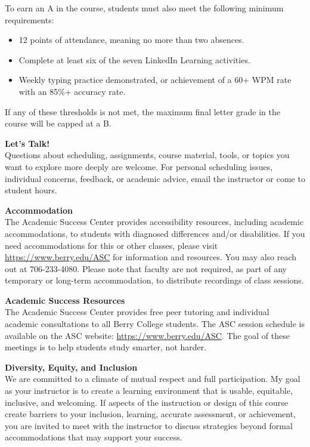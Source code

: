 \documentclass[11pt,letterpaper]{article}
\newcommand{\lefthead}[2]{\noindent\textbf{#1}\hfill\\[#2]}
\newcommand{\blankline}{\par\vspace{0.3cm}}
\begin{document}
\noindent To earn an A in the course, students must also meet the following minimum requirements:
\begin{itemize}
    \item 12 points of attendance, meaning no more than two absences.
    \item Complete at least six of the seven LinkedIn Learning activities.
    \item Weekly typing practice demonstrated, or achievement of a 60+ WPM rate with an 85\%+ accuracy rate.
\end{itemize}
If any of these thresholds is not met, the maximum final letter grade in the course will be capped at a B.
\blankline

\lefthead{Let's Talk!}{0.3cm}
Questions about scheduling, assignments, course material, tools, or topics you want to explore more deeply are welcome. For personal scheduling issues, individual concerns, feedback, or academic advice, email the instructor or come to student hours.
\blankline

\lefthead{Accommodation}{0.3cm}
The Academic Success Center provides accessibility resources, including academic accommodations, to students with diagnosed differences and/or disabilities. If you need accommodations for this or other classes, please visit \url{https://www.berry.edu/ASC} for information and resources. You may also reach out at 706-233-4080. Please note that faculty are not required, as part of any temporary or long-term accommodation, to distribute recordings of class sessions.
\blankline

\lefthead{Academic Success Resources}{0.3cm}
The Academic Success Center provides free peer tutoring and individual academic consultations to all Berry College students. The ASC session schedule is available on the ASC website: \url{https://www.berry.edu/ASC}. The goal of these meetings is to help students study smarter, not harder.
\blankline

\lefthead{Diversity, Equity, and Inclusion}{0.3cm}
We are committed to a climate of mutual respect and full participation. My goal as your instructor is to create a learning environment that is usable, equitable, inclusive, and welcoming. If aspects of the instruction or design of this course create barriers to your inclusion, learning, accurate assessment, or achievement, you are invited to meet with the instructor to discuss strategies beyond formal accommodations that may support your success.
\blankline
\end{document}
